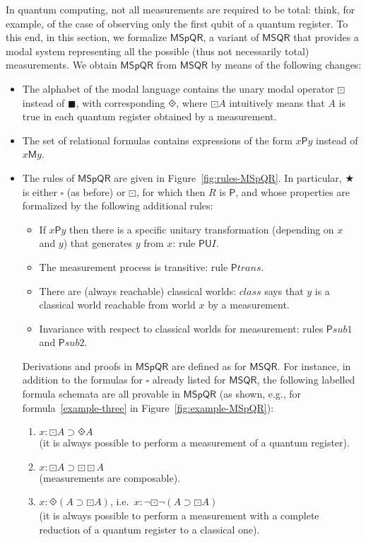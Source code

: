 \documentclass[times, 10pt]{article}
\newcommand{\varimp}{\supset}
\newcommand{\MSQR}{\textsf{MSQR}}
\newcommand{\MSpQR}{\textsf{MSpQR}}
\newcommand{\measB}{\blacksquare}
\newcommand{\uniB}{\square}
\newcommand{\Un}{\textsf{U}}
\newcommand{\Me}{\textsf{M}}
\renewcommand{\Un}{\mathsf{U}}
\renewcommand{\Me}{\mathsf{M}}
\newcommand{\PMe}{\mathsf{P}}
\newcommand{\class}{\mathit{class}}
\newcommand{\PMetrans}{\PMe\mathit{trans}}
\newcommand{\PMesubone}{\PMe\mathit{sub1}}
\newcommand{\PMesubtwo}{\PMe\mathit{sub2}}
\begin{document}
In quantum computing, not all measurements are required to be total: think, for example, of the case of observing only the first qubit of a quantum register. To this end, in this section, we formalize $\MSpQR$, a variant of $\MSQR$ that provides a modal system representing all the possible 
(thus not necessarily total) measurements. 
We obtain $\MSpQR$ from $\MSQR$ by means of the following changes: 
\begin{itemize}
\item The alphabet of the modal language contains the unary modal operator $\boxdot$ instead of $\measB$, with corresponding $\Diamonddot$, where $\boxdot A$ intuitively means that $A$ is true in each quantum register obtained by a measurement.
\item The set of relational formulas contains expressions of the form $x \PMe y$ instead of $x \Me y$.
\item The rules of $\MSpQR$ are given in Figure~\ref{fig:rules-MSpQR}. In particular, $\bigstar$ is either 
$\uniB$ (as before) or $\boxdot$, for which then $R$ is $\PMe$, and whose properties are formalized by  the following additional rules:
\begin{itemize}
\item If $x \PMe y$ then there is a specific unitary transformation
  (depending on $x$ and $y$) that generates $y$ from $x$: rule $\PMe\Un I$.
\item The measurement process is transitive: rule $\PMetrans$.
\item There are (always reachable) classical worlds: $\class$ says that $y$ is a classical world reachable from world $x$ by a measurement.
\item Invariance with respect to classical worlds for measurement: rules $\PMesubone$ and $\PMesubtwo$.
\end{itemize}
Derivations and proofs in $\MSpQR$ are defined as for $\MSQR$.
For instance, in addition to the formulas for $\uniB$ already listed for $\MSQR$, the following labelled formula schemata are all provable in $\MSpQR$ (as shown, e.g., for formula~\ref{example-three} in 
Figure~\ref{fig:example-MSpQR}):
\begin{enumerate}
\item $x: \boxdot A \varimp \Diamonddot A$ \\
(it is always possible to perform a measurement of a quantum register).
\item $x: \boxdot A \varimp \boxdot\boxdot A$ \\ 
 (measurements are composable).
\item\label{example-three} $x: \Diamonddot (A \varimp \boxdot A)$, 
i.e.~$x: \neg \boxdot \neg (A \varimp \boxdot A)$ \\ 
(it is always possible to perform a measurement with a complete reduction of a quantum register to a classical one).
\end{enumerate}
\end{itemize}
\end{document}
